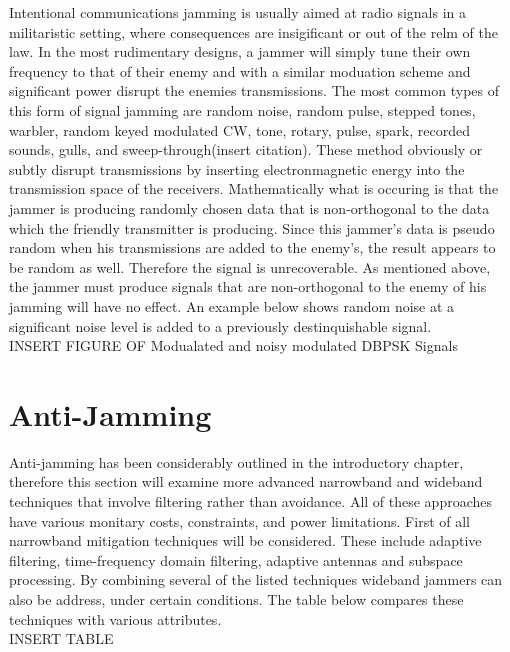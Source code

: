 Intentional communications jamming is usually aimed at radio signals in a militaristic setting, where consequences are insigificant or out of the relm of the law. In the most rudimentary designs, a jammer will simply tune their own frequency to that of their enemy and with a similar moduation scheme and significant power disrupt the enemies transmissions.  The most common types of this form of signal jamming are random noise, random pulse, stepped tones, warbler, random keyed modulated CW, tone, rotary, pulse, spark, recorded sounds, gulls, and sweep-through(insert citation).  These method obviously or subtly disrupt transmissions by inserting electronmagnetic energy into the transmission space of the receivers.  Mathematically what is occuring is that the jammer is producing randomly chosen data that is non-orthogonal to the data which the friendly transmitter is producing.  Since this jammer's data is pseudo random when his transmissions are added to the enemy's, the result appears to be random as well.  Therefore the signal is unrecoverable.  As mentioned above, the jammer must produce signals that are non-orthogonal to the enemy of his jamming will have no effect.  An example below shows random noise at a significant noise level is added to a previously destinquishable signal.\\

INSERT FIGURE OF Modualated and noisy modulated DBPSK Signals\\

\section{Anti-Jamming}

Anti-jamming has been considerably outlined in the introductory chapter, therefore this section will examine more advanced narrowband and wideband techniques that involve filtering rather than avoidance.  All of these approaches have various monitary costs, constraints, and power limitations.  First of all narrowband mitigation techniques will be considered.  These include adaptive filtering, time-frequency domain filtering, adaptive antennas and subspace processing.  By combining several of the listed techniques wideband jammers can also be address, under certain conditions.  The table below compares these techniques with various attributes.\\

INSERT TABLE\\

